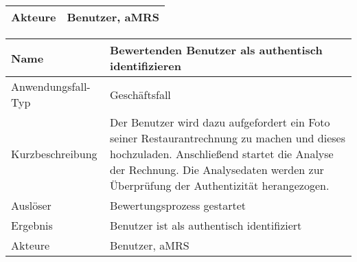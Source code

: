 \begin{table}[H]
\begin{tabularx}{\textwidth}{| l | X |}
        \hline
        Akteure            & Benutzer, \ac{aMRS}                                                                                                                                                                                                                                                                                                                                                                                                                                 \\
        \hline
    \end{tabularx}
\end{table}



\begin{table}[H]
    \centering
    \label{}
    \begin{tabularx}{\textwidth}{| l | X |}
        \hline
        Name               & Bewertenden Benutzer als authentisch identifizieren                                                                                                                                                                              \\
        \hline
        Anwendungsfall-Typ & Geschäftsfall                                                                                                                                                                                                                    \\
        \hline
        Kurzbeschreibung   & Der Benutzer wird dazu aufgefordert ein Foto seiner Restaurantrechnung zu machen und dieses hochzuladen. Anschließend startet die Analyse der Rechnung. Die Analysedaten werden zur Überprüfung der Authentizität herangezogen. \\
        \hline
        Auslöser           & Bewertungsprozess gestartet                                                                                                                                                                                                      \\
        \hline
        Ergebnis           & Benutzer ist als authentisch identifiziert                                                                                                                                                                                       \\
        \hline
        Akteure            & Benutzer, \ac{aMRS}                                                                                                                                                                                                              \\
        \hline
    \end{tabularx}
\end{table}

